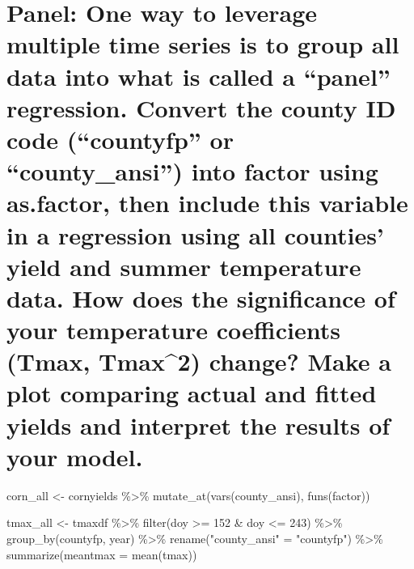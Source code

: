 \documentclass[
]{book}
\newenvironment{Shaded}{\begin{snugshade}}{\end{snugshade}}
\newcommand{\AttributeTok}[1]{\textcolor[rgb]{0.77,0.63,0.00}{#1}}
\newcommand{\DecValTok}[1]{\textcolor[rgb]{0.00,0.00,0.81}{#1}}
\newcommand{\FunctionTok}[1]{\textcolor[rgb]{0.00,0.00,0.00}{#1}}
\newcommand{\NormalTok}[1]{#1}
\newcommand{\OtherTok}[1]{\textcolor[rgb]{0.56,0.35,0.01}{#1}}
\newcommand{\SpecialCharTok}[1]{\textcolor[rgb]{0.00,0.00,0.00}{#1}}
\newcommand{\StringTok}[1]{\textcolor[rgb]{0.31,0.60,0.02}{#1}}
\begin{document}
\hypertarget{panel-one-way-to-leverage-multiple-time-series-is-to-group-all-data-into-what-is-called-a-panel-regression.-convert-the-county-id-code-countyfp-or-county_ansi-into-factor-using-as.factor-then-include-this-variable-in-a-regression-using-all-counties-yield-and-summer-temperature-data.-how-does-the-significance-of-your-temperature-coefficients-tmax-tmax2-change-make-a-plot-comparing-actual-and-fitted-yields-and-interpret-the-results-of-your-model.}{%
\section{Panel: One way to leverage multiple time series is to group all data into what is called a ``panel'' regression. Convert the county ID code (``countyfp'' or ``county\_ansi'') into factor using as.factor, then include this variable in a regression using all counties' yield and summer temperature data. How does the significance of your temperature coefficients (Tmax, Tmax\^{}2) change? Make a plot comparing actual and fitted yields and interpret the results of your model.}\label{panel-one-way-to-leverage-multiple-time-series-is-to-group-all-data-into-what-is-called-a-panel-regression.-convert-the-county-id-code-countyfp-or-county_ansi-into-factor-using-as.factor-then-include-this-variable-in-a-regression-using-all-counties-yield-and-summer-temperature-data.-how-does-the-significance-of-your-temperature-coefficients-tmax-tmax2-change-make-a-plot-comparing-actual-and-fitted-yields-and-interpret-the-results-of-your-model.}}

\begin{Shaded}
\begin{Highlighting}[]
\NormalTok{corn\_all }\OtherTok{\textless{}{-}}\NormalTok{ cornyields }\SpecialCharTok{\%\textgreater{}\%}
  \FunctionTok{mutate\_at}\NormalTok{(}\FunctionTok{vars}\NormalTok{(county\_ansi), }\FunctionTok{funs}\NormalTok{(factor))}
  
\NormalTok{tmax\_all }\OtherTok{\textless{}{-}}\NormalTok{ tmaxdf }\SpecialCharTok{\%\textgreater{}\%}
  \FunctionTok{filter}\NormalTok{(doy }\SpecialCharTok{\textgreater{}=} \DecValTok{152} \SpecialCharTok{\&}\NormalTok{ doy }\SpecialCharTok{\textless{}=} \DecValTok{243}\NormalTok{) }\SpecialCharTok{\%\textgreater{}\%}
  \FunctionTok{group\_by}\NormalTok{(countyfp, year) }\SpecialCharTok{\%\textgreater{}\%}
  \FunctionTok{rename}\NormalTok{(}\StringTok{"county\_ansi"} \OtherTok{=} \StringTok{"countyfp"}\NormalTok{) }\SpecialCharTok{\%\textgreater{}\%}
  \FunctionTok{summarize}\NormalTok{(}\AttributeTok{meantmax =} \FunctionTok{mean}\NormalTok{(tmax))}
\end{Highlighting}
\end{Shaded}
\end{document}
